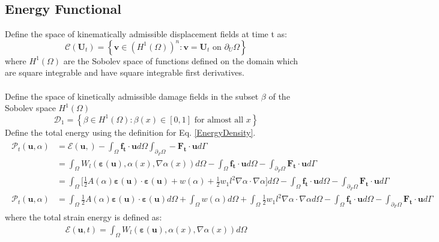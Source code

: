 \documentclass[12pt,3p]{article}
\numberwithin{equation}{section}
\begin{document}
\subsection{Energy Functional}
Define the space of kinematically admissible displacement fields at time t as: 
\begin{equation}\label{KinDispFields}
\mathcal{C}\left(\mathbf{U}_{t}\right)=\left\{\mathbf{v} \in\left(H^{1}(\Omega)\right)^{n}: \mathbf{v}=\mathbf{U}_{t} \text { on } \partial_{U} \Omega\right\}
\end{equation}
where $H^{1} (\Omega)$ are the Sobolev space of functions defined on the domain which are square integrable and have square integrable first derivatives. \\ \\
Define the space of kinetically admissible damage fields in the subset $\beta$ of the Sobolev space $H^{1} (\Omega)$
\begin{equation}\label{KinDamFields}
\mathcal{D}_{1}=\left\{\beta \in H^{1}(\Omega): \beta(x) \in[0,1] \text { for almost all } x\right\}
\end{equation}
Define the total energy using the definition for Eq. \ref{EnergyDensity}.
\begin{align}\label{TotalEnergy}
\begin{split}
\mathcal{P}_t (\mathbf{u}, \alpha) &= \mathcal{E} (\mathbf{u}, ) - \int_{\Omega} \mathbf{f_t} \cdot \mathbf{u} d \Omega \int_{\partial_F \Omega} - \mathbf{F_t} \cdot \mathbf{u} d \Gamma \\
						   &= \int_{\Omega} W_l (\boldsymbol{\varepsilon} (\mathbf{u}), \alpha (x), \nabla \alpha (x)) d \Omega - \int_{\Omega} \mathbf{f_t} \cdot \mathbf{u} d \Omega - \int_{\partial_F \Omega} \mathbf{F_t} \cdot \mathbf{u} d \Gamma \\
						   &= \int_{\Omega} \bigg[ \frac{1}{2} A (\alpha) \boldsymbol{\varepsilon} (\mathbf{u}) \cdot \boldsymbol{\varepsilon} (\mathbf{u}) + w (\alpha) + \frac{1}{2} w_1 l^2 \nabla \alpha \cdot \nabla \alpha \bigg] d \Omega - \int_{\Omega} \mathbf{f_t} \cdot \mathbf{u} d \Omega - \int_{\partial_F \Omega} \mathbf{F_t} \cdot \mathbf{u} d \Gamma \\
\mathcal{P}_t (\mathbf{u}, \alpha) &= \int_{\Omega} \frac{1}{2} A (\alpha) \boldsymbol{\varepsilon} (\mathbf{u}) \cdot \boldsymbol{\varepsilon} (\mathbf{u}) d \Omega + \int_{\Omega} w (\alpha) d \Omega + \int_{\Omega} \frac{1}{2} w_1 l^2 \nabla \alpha \cdot \nabla \alpha d \Omega - \int_{\Omega} \mathbf{f_t} \cdot \mathbf{u} d \Omega - \int_{\partial_F \Omega} \mathbf{F_t} \cdot \mathbf{u} d \Gamma
\end{split}
\end{align}
where the total strain energy is defined as: 
\begin{align}\label{TotalStrainEnergy}
\mathcal{E} (\mathbf{u}, t)  = \int_{\Omega} W_l (\boldsymbol{\varepsilon} (\mathbf{u}), \alpha (x), \nabla \alpha (x)) d \Omega
\end{align}
\end{document}
